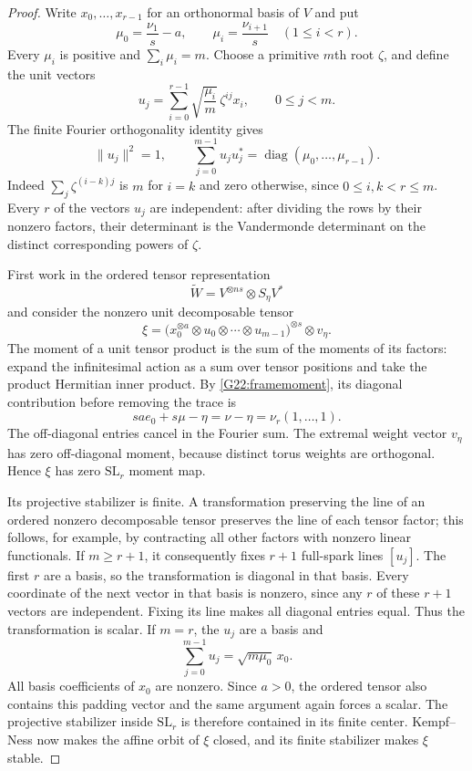 \begin{proof}
Write $x_0,\ldots,x_{r-1}$ for an orthonormal basis of $V$ and put
\[
 \mu_0=\frac{\nu_1}{s}-a,\qquad
 \mu_i=\frac{\nu_{i+1}}s\quad(1\le i<r).
\]
Every $\mu_i$ is positive and $\sum_i\mu_i=m$.
Choose a primitive $m$th root $\zeta$, and define the unit vectors
\begin{equation}\label{G22:frame}
 u_j=\sum_{i=0}^{r-1}\sqrt{\frac{\mu_i}{m}}\,
                    \zeta^{ij}x_i,\qquad 0\le j<m.
\end{equation}
The finite Fourier orthogonality identity gives
\begin{equation}\label{G22:framemoment}
 \|u_j\|^2=1,\qquad
 \sum_{j=0}^{m-1}u_ju_j^*=\operatorname{diag}(\mu_0,\ldots,\mu_{r-1}).
\end{equation}
Indeed $\sum_j\zeta^{(i-k)j}$ is $m$ for $i=k$ and zero
otherwise, since $0\le i,k<r\le m$.
Every $r$ of the vectors $u_j$ are independent: after dividing
the rows by their nonzero factors, their determinant is the
Vandermonde determinant on the distinct corresponding powers
of $\zeta$.

First work in the ordered tensor representation
\[
 \widetilde W=V^{\otimes ns}\otimes S_\eta V^*
\]
and consider the nonzero unit decomposable tensor
\[
 \xi=\bigl(x_0^{\otimes a}\otimes
             u_0\otimes\cdots\otimes u_{m-1}\bigr)^{\otimes s}
               \otimes v_\eta.
\]
The moment of a unit tensor product is the sum of the moments
of its factors: expand the infinitesimal action as a sum over
tensor positions and take the product Hermitian inner product.
By \eqref{G22:framemoment}, its diagonal contribution before
removing the trace is
\[
 sa e_0+s\mu-\eta=\nu-\eta=\nu_r(1,\ldots,1).
\]
The off-diagonal entries cancel in the Fourier sum. The
extremal weight vector $v_\eta$ has zero off-diagonal moment,
because distinct torus weights are orthogonal. Hence $\xi$
has zero $\mathrm{SL}_r$ moment map.

Its projective stabilizer is finite. A transformation preserving
the line of an ordered nonzero decomposable tensor preserves
the line of each tensor factor; this follows, for example, by
contracting all other factors with nonzero linear functionals.
If $m\ge r+1$, it consequently fixes $r+1$ full-spark lines
$[u_j]$. The first $r$ are a basis, so the transformation is
diagonal in that basis. Every coordinate of the next vector
in that basis is nonzero, since any $r$ of these $r+1$ vectors
are independent. Fixing its line makes all diagonal entries
equal. Thus the transformation is scalar.
If $m=r$, the $u_j$ are a basis and
\[
 \sum_{j=0}^{m-1}u_j=\sqrt{m\mu_0}\,x_0.
\]
All basis coefficients of $x_0$ are nonzero. Since $a>0$,
the ordered tensor also contains this padding vector and
the same argument again forces a scalar. The projective
stabilizer inside $\mathrm{SL}_r$ is therefore contained in
its finite center. Kempf--Ness now makes the affine orbit
of $\xi$ closed, and its finite stabilizer makes $\xi$ stable.


\end{proof}
